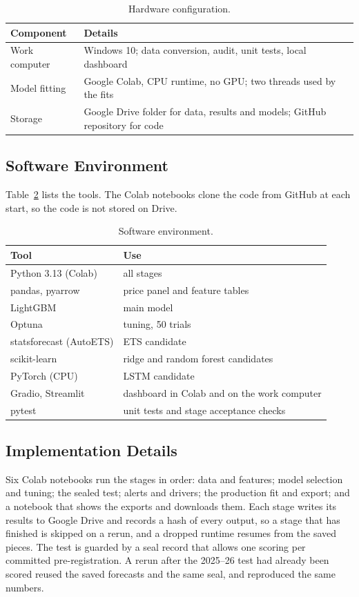 \documentclass[12pt]{report}
\begin{document}
\begin{table}[H]\centering\small
\caption{Hardware configuration.}\label{tab:hardware}
\begin{tabular}{|l|p{8cm}|}
\hline
\textbf{Component} & \textbf{Details} \\
\hline
Work computer & Windows 10; data conversion, audit, unit tests, local dashboard \\
\hline
Model fitting & Google Colab, CPU runtime, no GPU; two threads used by the fits \\
\hline
Storage & Google Drive folder for data, results and models; GitHub repository for code \\
\hline
\end{tabular}
\end{table}

\subsection{Software Environment}
Table~\ref{tab:software} lists the tools. The Colab notebooks clone the code from GitHub at each start, so the code is not stored on Drive.

\begin{table}[H]\centering\small
\caption{Software environment.}\label{tab:software}
\begin{tabular}{|l|p{8cm}|}
\hline
\textbf{Tool} & \textbf{Use} \\
\hline
Python 3.13 (Colab) & all stages \\
\hline
pandas, pyarrow & price panel and feature tables \\
\hline
LightGBM & main model \\
\hline
Optuna & tuning, 50 trials \\
\hline
statsforecast (AutoETS) & ETS candidate \\
\hline
scikit-learn & ridge and random forest candidates \\
\hline
PyTorch (CPU) & LSTM candidate \\
\hline
Gradio, Streamlit & dashboard in Colab and on the work computer \\
\hline
pytest & unit tests and stage acceptance checks \\
\hline
\end{tabular}
\end{table}

\subsection{Implementation Details}
Six Colab notebooks run the stages in order: data and features; model selection and tuning; the sealed test; alerts and drivers; the production fit and export; and a notebook that shows the exports and downloads them. Each stage writes its results to Google Drive and records a hash of every output, so a stage that has finished is skipped on a rerun, and a dropped runtime resumes from the saved pieces. The test is guarded by a seal record that allows one scoring per committed pre-registration. A rerun after the 2025--26 test had already been scored reused the saved forecasts and the same seal, and reproduced the same numbers.
\end{document}
